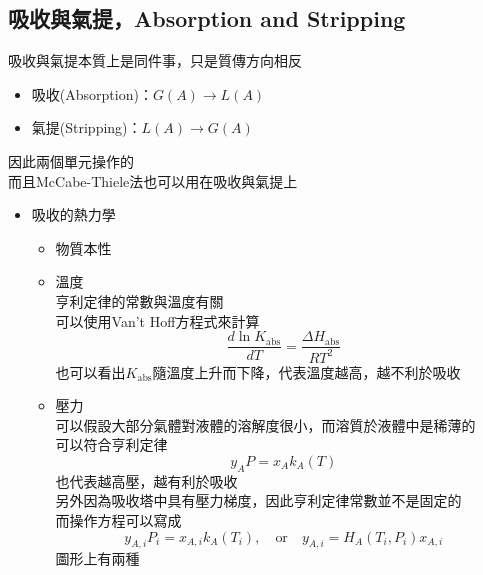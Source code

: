 \documentclass[../main.tex]{subfiles}
\begin{document}
  \subsection{吸收與氣提，Absorption and Stripping}
  吸收與氣提本質上是同件事，只是質傳方向相反
  \begin{itemize}
    \item 吸收(Absorption)：$G(A)\rightarrow L(A)$
    \item 氣提(Stripping)：$L(A)\rightarrow G(A)$
  \end{itemize}
  因此兩個單元操作的\\
  而且McCabe-Thiele法也可以用在吸收與氣提上
  \begin{itemize}
    \item 吸收的熱力學
    \begin{itemize}
      \item 物質本性
      \item 溫度\\
      亨利定律的常數與溫度有關\\
      可以使用Van't Hoff方程式來計算
      \begin{equation}
        \frac{d\ln K_{\text{abs}}}{dT}=\frac{\Delta H_{\text{abs}}}{RT^2}
      \end{equation}
      也可以看出$K_{\text{abs}}$隨溫度上升而下降，代表溫度越高，越不利於吸收
      \item 壓力\\
      可以假設大部分氣體對液體的溶解度很小，而溶質於液體中是稀薄的\\
      可以符合亨利定律
      \begin{equation}
        y_AP= x_Ak_A(T)
      \end{equation}
      也代表越高壓，越有利於吸收\\
      另外因為吸收塔中具有壓力梯度，因此亨利定律常數並不是固定的\\
      而操作方程可以寫成
      \begin{equation}
        y_{A,i}P_i = x_{A,i}k_A(T_i),\quad\text{or}\quad y_{A,i}=H_A(T_i,P_i)x_{A,i}
      \end{equation}
      圖形上有兩種
      \begin{figure}[H]
        \centering
\end{figure}
\end{itemize}
\end{itemize}
\end{document}
